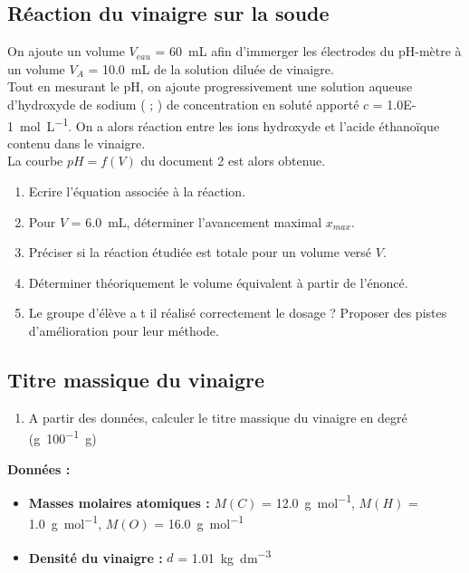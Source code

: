 \documentclass[a4paper,11pt,fleqn]{article}%
\begin{document}
	\subsection{Réaction du vinaigre sur la soude}
	On ajoute un volume $V_{eau}$ = \SI{60}{mL} afin d'immerger les électrodes du pH-mètre à un volume $V_A$ = \SI{10,0}{mL} de la solution diluée de vinaigre.\\
	Tout en mesurant le pH, on ajoute progressivement une solution aqueuse d'hydroxyde de sodium ( ; ) de concentration en soluté apporté $c$ = \SI{1.0E-1}{\mole\per\liter}. On a alors réaction entre les ions hydroxyde et l'acide éthanoïque contenu dans le vinaigre.\\
	La courbe $pH = f(V)$ du document 2 est alors obtenue.
	\begin{enumerate}[resume]
		\item Ecrire  l'équation associée à la réaction.
		\item Pour $V$ = \SI{6.0}{mL}, déterminer l'avancement maximal $x_{max}$.
		\item Préciser si la réaction étudiée est totale pour un volume versé $V$.
		\item Déterminer théoriquement le volume équivalent à partir de l'énoncé.
		\item Le groupe d'élève a t il réalisé correctement le dosage ? Proposer des pistes d'amélioration pour leur méthode.
	\end{enumerate}
	
	\subsection{Titre massique du vinaigre}
	\begin{enumerate}[resume]
		\item  A partir des données, calculer le titre massique du vinaigre en degré (\unit{\gram\per 100\gram})
	\end{enumerate}

\noindent \colorbox{red!10}{\begin{minipage}{.97\textwidth}
\textbf{Données :}
\begin{itemize}
	\item \textbf{Masses molaires atomiques : } $M(C)$ = \SI{12.0}{\gram\per\mole}, $M(H)$ = \SI{1.0}{\gram\per\mole}, $M(O)$ = \SI{16.0}{\gram\per\mole}
	\item \textbf{Densité du vinaigre : } $d$ = \SI{1.01}{\kilo\gram\per\deci\meter\cubed}
\end{itemize}
\end{minipage}
}
\vspace{1em}
\end{document}
